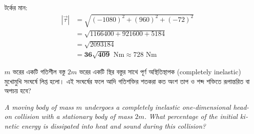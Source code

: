 \documentclass[12pt, a4paper]{article}
\begin{document}
\begin{tcolorbox}[solutionbox={সমাধান (Solution)}]
    টর্কের মান:
    \begin{align*}
        |\vec{\tau}| &= \sqrt{(-1080)^2 + (960)^2 + (-72)^2} \\
        &= \sqrt{1166400 + 921600 + 5184} \\
        &= \sqrt{2093184} \\
        &= \mathbf{36\sqrt{409}}\text{ Nm} \approx 728\text{ Nm}
    \end{align*}
\end{tcolorbox}

\newpage

\begin{tcolorbox}[questionbox={প্রশ্ন (Question) 29}]
    \noindent
    $m$ ভরের একটি গতিশীল বস্তু $2m$ ভরের একটি স্থির বস্তুর সাথে পূর্ণ অস্থিতিস্থাপক (completely inelastic) মুখোমুখি সংঘর্ষে লিপ্ত হলো। এই সংঘর্ষের ফলে আদি গতিশক্তির শতকরা কত অংশ তাপ ও শব্দ শক্তিতে রূপান্তরিত বা অপচয় হবে?
    
    \vspace{0.8em}
    \begin{english}
    \noindent\textit{\color{darkgray}
    A moving body of mass $m$ undergoes a completely inelastic one-dimensional head-on collision with a stationary body of mass $2m$. What percentage of the initial kinetic energy is dissipated into heat and sound during this collision?
    }
    \end{english}
\end{tcolorbox}
\end{document}
